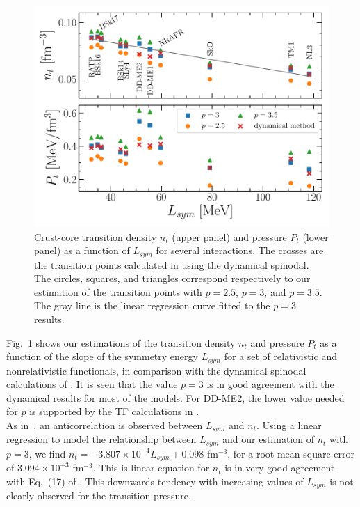 \begin{figure}[!t]
\begin{center}
  \includegraphics[width=0.9\linewidth]{figures/cctp_lsym.pdf}
\end{center}
\caption[Crust-core transition density and pressure for several interactions]{Crust-core 
  transition density $n_t$ (upper panel) and pressure $P_t$ 
(lower panel) as a function of $L_{sym}$ for several interactions. The crosses 
are the transition points calculated in \cite{Ducoin2011} using the dynamical
spinodal. The circles, squares, and triangles correspond respectively to our
estimation of the transition points with $p=2.5$, $p=3$, 
and $p=3.5$. The gray line is the linear regression curve fitted to the $p=3$ 
results.}\label{fig:cctp_lsym}
\end{figure}

Fig.~\ref{fig:cctp_lsym} shows our estimations of the transition density $n_t$ 
and pressure $P_t$ as a function of the slope of the symmetry energy $L_{sym}$ 
for a set of relativistic and nonrelativistic functionals, in 
comparison with the dynamical spinodal calculations of \cite{Ducoin2011}. It is
seen that the value $p=3$ is in good agreement with the dynamical results for
most of the models. For DD-ME2, the lower value needed for $p$ is supported by
the TF calculations in \cite{Grill2012}.\\
As in~\cite{Vinas2017}, an anticorrelation is observed between $L_{sym}$ and 
$n_t$. Using a linear regression to model the relationship between $L_{sym}$
and our estimation of $n_t$ with $p=3$, we find $n_t = -3.807\times
10^{-4}L_{sym} + 0.098$ fm$^{-3}$, for a root mean square error of 
$3.094\times 10^{-3}$ fm$^{-3}$. This is linear equation for $n_t$ is in very
good agreement with Eq.~(17) of \cite{Ducoin2011}.
This downwards tendency with increasing values of $L_{sym}$ is not clearly 
observed for the transition pressure. 

